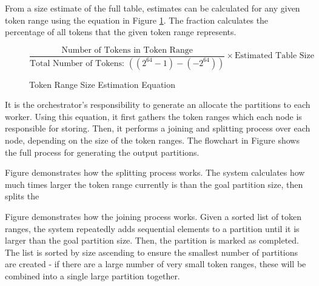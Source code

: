From a size estimate of the full table, estimates can be calculated for any given token range using the equation in Figure \ref{fig:token-range-estimation}. The fraction calculates the percentage of all tokens that the given token range represents.

\begin{figure}[h]
	\centering
	\[ \frac{\text{Number of Tokens in Token Range}}{\text{Total Number of Tokens: } ((2^{64}-1) - (-2^{64}))} \times \text{Estimated Table Size} \]
	\caption{Token Range Size Estimation Equation}
	\label{fig:token-range-estimation}
\end{figure}

It is the orchestrator's responsibility to generate an allocate the partitions to each worker. Using this equation, it first gathers the token ranges which each node is responsible for storing. Then, it performs a joining and splitting process over each node, depending on the size of the token ranges. The flowchart in Figure  shows the full process for generating the output partitions.



Figure  demonstrates how the splitting process works. The system calculates how much times larger the token range currently is than the goal partition size, then splits the 


Figure  demonstrates how the joining process works. Given a sorted list of token ranges, the system repeatedly adds sequential elements to a partition until it is larger than the goal partition size. Then, the partition is marked as completed. The list is sorted by size ascending to ensure the smallest number of partitions are created - if there are a large number of very small token ranges, these will be combined into a single large partition together.

